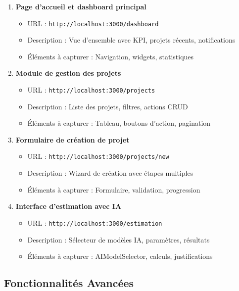 \begin{enumerate}
    \item \textbf{Page d'accueil et dashboard principal}
    \begin{itemize}
        \item URL : \texttt{http://localhost:3000/dashboard}
        \item Description : Vue d'ensemble avec KPI, projets récents, notifications
        \item Éléments à capturer : Navigation, widgets, statistiques
    \end{itemize}
    
    \item \textbf{Module de gestion des projets}
    \begin{itemize}
        \item URL : \texttt{http://localhost:3000/projects}
        \item Description : Liste des projets, filtres, actions CRUD
        \item Éléments à capturer : Tableau, boutons d'action, pagination
    \end{itemize}
    
    \item \textbf{Formulaire de création de projet}
    \begin{itemize}
        \item URL : \texttt{http://localhost:3000/projects/new}
        \item Description : Wizard de création avec étapes multiples
        \item Éléments à capturer : Formulaire, validation, progression
    \end{itemize}
    
    \item \textbf{Interface d'estimation avec IA}
    \begin{itemize}
        \item URL : \texttt{http://localhost:3000/estimation}
        \item Description : Sélecteur de modèles IA, paramètres, résultats
        \item Éléments à capturer : AIModelSelector, calculs, justifications
    \end{itemize}
\end{enumerate}

\subsection{Fonctionnalités Avancées}

